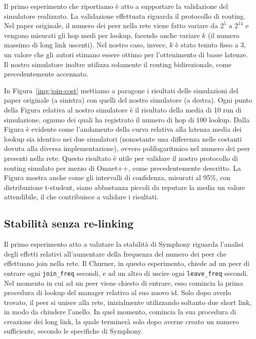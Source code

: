 \documentclass[prodmode,acmtap]{acmlarge}
\begin{document}
Il primo esperimento che riportiamo è atto a supportare la validazione del simulatore realizzato. La validazione effettuata riguarda il protocollo di routing. Nel paper originale, il numero dei peer nella rete viene fatto variare da $2^5$ a $2^{14}$ e vengono misurati gli hop medi per lookup, facendo anche variare $k$ (il numero massimo di long link uscenti). Nel nostro caso, invece, $k$ è stato tenuto fisso a $3$, un valore che gli autori stimano essere ottimo per l'ottenimento di basse latenze. Il nostro simulatore inoltre utilizza solamente il routing bidirezionale, come precedentemente accennato.

In Figura~\ref{img:join-cost} mettiamo a paragone i risultati delle simulazioni del paper originale (a sinistra) con quelli del nostro simulatore (a destra). Ogni punto della Figura relativa al nostro simulatore è il risultato della media di 10 run di simulazione, ognuno dei quali ha registrato il numero di hop di 100 lookup. Dalla Figura è evidente come l'andamento della curva relativa alla latenza media dei lookup sia identico nei due simulatori (nonostante una differenza nelle costanti dovuta alla diversa implementazione), ovvero polilogaritmico nel numero dei peer presenti nella rete. Questo risultato è utile per validare il nostro protocollo di routing simulato per mezzo di Omnet++, come precedentemente descritto. La Figura mostra anche come gli intervalli di confidenza, misurati al 95\%, con distribuzione t-student, siano abbastanza piccoli da reputare la media un valore attendibile, il che contribuisce a validare i risultati.

\subsection{Stabilità senza re-linking}
Il primo esperimento atto a valutare la stabilità di Symphony riguarda l'analisi degli effetti relativi all'aumentare della frequenza del numero dei peer che effettuano join nella rete.
Il Churner, in questo esperimento, chiede ad un peer di entrare ogni \texttt{join\_freq} secondi, e ad un altro di uscire ogni \texttt{leave\_freq} secondi. Nel momento in cui ad un peer viene chiesto di entrare, esso comincia la prima procedura di lookup del manager relativo al suo nuovo id. Solo dopo averlo trovato, il peer si unisce alla rete, inizialmente utilizzando soltanto due short link, in modo da chiudere l'anello. In quel momento, comincia la sua procedura di creazione dei long link, la quale terminerà solo dopo averne creato un numero sufficiente, secondo le specifiche di Symphony.
\end{document}
